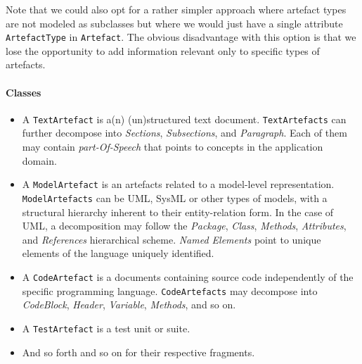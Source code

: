 Note that we could also opt for a rather simpler approach where artefact types are not modeled as subclasses but where we would just have a single attribute \texttt{ArtefactType} in \texttt{Artefact}. The obvious disadvantage with this option is that we lose the opportunity to add information relevant only to specific types of artefacts.

\paragraph{Classes}
\begin{itemize}
    \item A \texttt{TextArtefact} is a(n) (un)structured text document. \texttt{TextArtefacts} can further decompose into \textit{Sections}, \textit{Subsections}, and \textit{Paragraph}. Each of them may contain \textit{part-Of-Speech} that points to concepts in the application domain.
    
    \item A \texttt{ModelArtefact} is an artefacts related to a model-level representation. \texttt{ModelArtefacts} can be UML, SysML or other types of models, with a structural hierarchy inherent to their entity-relation form. In the case of UML, a decomposition may follow the \textit{Package}, \textit{Class}, \textit{Methods}, \textit{Attributes}, and \textit{References} hierarchical scheme. \textit{Named Elements} point to unique elements of the language uniquely identified.
    
    \item A \texttt{CodeArtefact} is a documents containing source code independently of the specific programming language. \texttt{CodeArtefacts} may decompose into \textit{CodeBlock}, \textit{Header}, \textit{Variable}, \textit{Methods}, and so on. 
    
    \item A \texttt{TestArtefact} is a test unit or suite.
    
    \item And so forth and so on for their respective fragments.
    
\end{itemize}

\pagebreak
